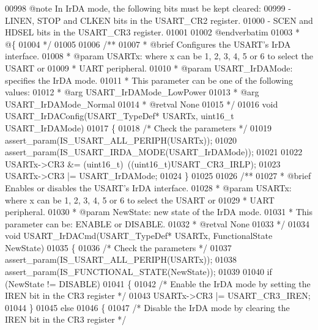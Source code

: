 \begin{DoxyCode}
00998 \textcolor{comment}{@note In IrDA mode, the following bits must be kept cleared:}
00999 \textcolor{comment}{        - LINEN, STOP and CLKEN bits in the USART\_CR2 register.}
01000 \textcolor{comment}{        - SCEN and HDSEL bits in the USART\_CR3 register.}
01001 \textcolor{comment}{}
01002 \textcolor{comment}{@endverbatim}
01003 \textcolor{comment}{  * @\{}
01004 \textcolor{comment}{  */}
01005 
01006 \textcolor{comment}{/**}
01007 \textcolor{comment}{  * @brief  Configures the USART's IrDA interface.}
01008 \textcolor{comment}{  * @param  USARTx: where x can be 1, 2, 3, 4, 5 or 6 to select the USART or }
01009 \textcolor{comment}{  *         UART peripheral.}
01010 \textcolor{comment}{  * @param  USART\_IrDAMode: specifies the IrDA mode.}
01011 \textcolor{comment}{  *          This parameter can be one of the following values:}
01012 \textcolor{comment}{  *            @arg USART\_IrDAMode\_LowPower}
01013 \textcolor{comment}{  *            @arg USART\_IrDAMode\_Normal}
01014 \textcolor{comment}{  * @retval None}
01015 \textcolor{comment}{  */}
01016 \textcolor{keywordtype}{void} USART_IrDAConfig(USART\_TypeDef* USARTx, uint16\_t USART\_IrDAMode)
01017 \{
01018   \textcolor{comment}{/* Check the parameters */}
01019   assert_param(IS\_USART\_ALL\_PERIPH(USARTx));
01020   assert_param(IS\_USART\_IRDA\_MODE(USART\_IrDAMode));
01021 
01022   USARTx->CR3 &= (uint16\_t)~((uint16\_t)USART_CR3_IRLP);
01023   USARTx->CR3 |= USART\_IrDAMode;
01024 \}
01025 
01026 \textcolor{comment}{/**}
01027 \textcolor{comment}{  * @brief  Enables or disables the USART's IrDA interface.}
01028 \textcolor{comment}{  * @param  USARTx: where x can be 1, 2, 3, 4, 5 or 6 to select the USART or }
01029 \textcolor{comment}{  *         UART peripheral.}
01030 \textcolor{comment}{  * @param  NewState: new state of the IrDA mode.}
01031 \textcolor{comment}{  *          This parameter can be: ENABLE or DISABLE.}
01032 \textcolor{comment}{  * @retval None}
01033 \textcolor{comment}{  */}
01034 \textcolor{keywordtype}{void} USART_IrDACmd(USART\_TypeDef* USARTx, FunctionalState NewState)
01035 \{
01036   \textcolor{comment}{/* Check the parameters */}
01037   assert_param(IS\_USART\_ALL\_PERIPH(USARTx));
01038   assert_param(IS\_FUNCTIONAL\_STATE(NewState));
01039 
01040   \textcolor{keywordflow}{if} (NewState != DISABLE)
01041   \{
01042     \textcolor{comment}{/* Enable the IrDA mode by setting the IREN bit in the CR3 register */}
01043     USARTx->CR3 |= USART_CR3_IREN;
01044   \}
01045   \textcolor{keywordflow}{else}
01046   \{
01047     \textcolor{comment}{/* Disable the IrDA mode by clearing the IREN bit in the CR3 register */}

\end{DoxyCode}
